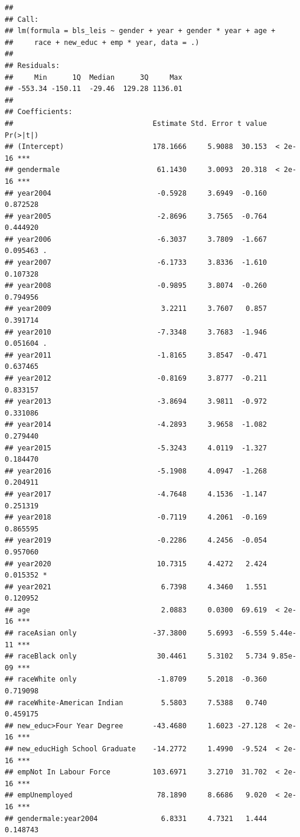 \documentclass[
]{article}
\begin{document}
\begin{verbatim}
## 
## Call:
## lm(formula = bls_leis ~ gender + year + gender * year + age + 
##     race + new_educ + emp * year, data = .)
## 
## Residuals:
##     Min      1Q  Median      3Q     Max 
## -553.34 -150.11  -29.46  129.28 1136.01 
## 
## Coefficients:
##                                 Estimate Std. Error t value Pr(>|t|)    
## (Intercept)                     178.1666     5.9088  30.153  < 2e-16 ***
## gendermale                       61.1430     3.0093  20.318  < 2e-16 ***
## year2004                         -0.5928     3.6949  -0.160 0.872528    
## year2005                         -2.8696     3.7565  -0.764 0.444920    
## year2006                         -6.3037     3.7809  -1.667 0.095463 .  
## year2007                         -6.1733     3.8336  -1.610 0.107328    
## year2008                         -0.9895     3.8074  -0.260 0.794956    
## year2009                          3.2211     3.7607   0.857 0.391714    
## year2010                         -7.3348     3.7683  -1.946 0.051604 .  
## year2011                         -1.8165     3.8547  -0.471 0.637465    
## year2012                         -0.8169     3.8777  -0.211 0.833157    
## year2013                         -3.8694     3.9811  -0.972 0.331086    
## year2014                         -4.2893     3.9658  -1.082 0.279440    
## year2015                         -5.3243     4.0119  -1.327 0.184470    
## year2016                         -5.1908     4.0947  -1.268 0.204911    
## year2017                         -4.7648     4.1536  -1.147 0.251319    
## year2018                         -0.7119     4.2061  -0.169 0.865595    
## year2019                         -0.2286     4.2456  -0.054 0.957060    
## year2020                         10.7315     4.4272   2.424 0.015352 *  
## year2021                          6.7398     4.3460   1.551 0.120952    
## age                               2.0883     0.0300  69.619  < 2e-16 ***
## raceAsian only                  -37.3800     5.6993  -6.559 5.44e-11 ***
## raceBlack only                   30.4461     5.3102   5.734 9.85e-09 ***
## raceWhite only                   -1.8709     5.2018  -0.360 0.719098    
## raceWhite-American Indian         5.5803     7.5388   0.740 0.459175    
## new_educ>Four Year Degree       -43.4680     1.6023 -27.128  < 2e-16 ***
## new_educHigh School Graduate    -14.2772     1.4990  -9.524  < 2e-16 ***
## empNot In Labour Force          103.6971     3.2710  31.702  < 2e-16 ***
## empUnemployed                    78.1890     8.6686   9.020  < 2e-16 ***
## gendermale:year2004               6.8331     4.7321   1.444 0.148743    

\end{verbatim}
\end{document}
